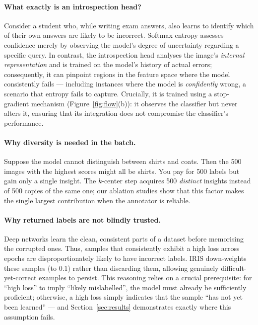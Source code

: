 \documentclass[a4paper,fleqn,longmktitle]{cas-sc}
\newcommand{\method}{IRIS}
\begin{document}
\paragraph{What exactly is an introspection head?} Consider a student
who, while writing exam answers, also learns to identify which of their
own answers are likely to be incorrect. Softmax entropy assesses
confidence merely by observing the model's degree of uncertainty
regarding a specific query. In contrast, the introspection head
analyses the image's \emph{internal representation} and is trained on
the model's history of actual errors; consequently, it can pinpoint
regions in the feature space where the model consistently fails ---
including instances where the model is \emph{confidently} wrong, a
scenario that entropy fails to capture. Crucially, it is trained using
a stop-gradient mechanism (Figure~\ref{fig:flow}(b)): it observes the
classifier but never alters it, ensuring that its integration does not
compromise the classifier's performance.

\paragraph{Why diversity is needed in the batch.} Suppose the model
cannot distinguish between shirts and coats. Then the 500 images with
the highest scores might all be shirts. You pay for 500 labels but gain
only a single insight. The $k$-center step acquires 500 \emph{distinct}
insights instead of 500 copies of the same one; our ablation studies
show that this factor makes the single largest contribution when the
annotator is reliable.

\paragraph{Why returned labels are not blindly trusted.} Deep networks
learn the clean, consistent parts of a dataset before memorising the
corrupted ones. Thus, samples that consistently exhibit a high loss
across epochs are disproportionately likely to have incorrect labels.
\method{} down-weights these samples (to $0.1$) rather than discarding
them, allowing genuinely difficult-yet-correct examples to persist.
This reasoning relies on a crucial prerequisite: for ``high loss'' to
imply ``likely mislabelled'', the model must already be sufficiently
proficient; otherwise, a high loss simply indicates that the sample
``has not yet been learned'' --- and Section~\ref{sec:results}
demonstrates exactly where this assumption fails.
\end{document}
